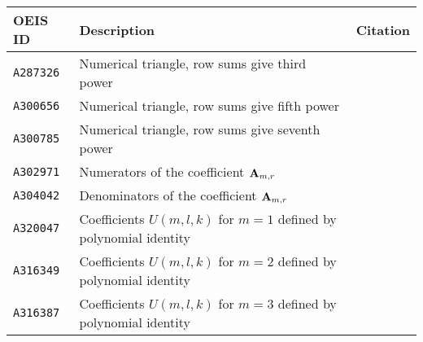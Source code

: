 \begin{center}
    \renewcommand{\arraystretch}{1.3}
    \begin{tabular}{lll}
        \toprule
        \textbf{OEIS ID} & \textbf{Description}                                                 & \textbf{Citation}                                                  \\
        \midrule
        \texttt{A287326} & Numerical triangle, row sums give third power                        & ~\cite{oeis_numerical_triangle_row_sums_give_cubes}                \\
        \texttt{A300656} & Numerical triangle, row sums give fifth power                        & ~\cite{oeis_numerical_triangle_row_sums_give_fifth_powers}         \\
        \texttt{A300785} & Numerical triangle, row sums give seventh power                      & ~\cite{oeis_numerical_triangle_row_sums_give_seventh_powers}       \\
        \texttt{A302971} & Numerators of the coefficient ${\mathbf{A}} \sb{m,r}$                        & ~\cite{oeis_numerators_of_the_coefficient_a_m_r}                   \\
        \texttt{A304042} & Denominators of the coefficient ${\mathbf{A}} \sb{m,r}$                      & ~\cite{oeis_denominators_of_the_coefficient_a_m_r}                 \\
        \texttt{A320047} & Coefficients $U(m, l, k)$ for $m = 1$ defined by polynomial identity & ~\cite{oeis_coefficients_u_m_l_k_defined_by_polynomial_identity_1} \\
        \texttt{A316349} & Coefficients $U(m, l, k)$ for $m = 2$ defined by polynomial identity & ~\cite{oeis_coefficients_u_m_l_k_defined_by_polynomial_identity_2} \\
        \texttt{A316387} & Coefficients $U(m, l, k)$ for $m = 3$ defined by polynomial identity & ~\cite{oeis_coefficients_u_m_l_k_defined_by_polynomial_identity_3} \\
        \bottomrule
    \end{tabular}
\end{center}
